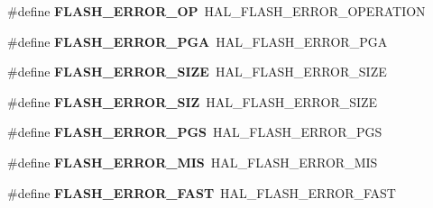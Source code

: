 \begin{DoxyCompactItemize}
\#define {\bfseries F\+L\+A\+S\+H\+\_\+\+E\+R\+R\+O\+R\+\_\+\+OP}~H\+A\+L\+\_\+\+F\+L\+A\+S\+H\+\_\+\+E\+R\+R\+O\+R\+\_\+\+O\+P\+E\+R\+A\+T\+I\+ON
\item 
\mbox{\label{group___h_a_l___f_l_a_s_h___aliased___defines_ga3e610cf7bc499ea0e7eee1380a04f42d}} 
\#define {\bfseries F\+L\+A\+S\+H\+\_\+\+E\+R\+R\+O\+R\+\_\+\+P\+GA}~H\+A\+L\+\_\+\+F\+L\+A\+S\+H\+\_\+\+E\+R\+R\+O\+R\+\_\+\+P\+GA
\item 
\mbox{\label{group___h_a_l___f_l_a_s_h___aliased___defines_gac056ad0617d3beaf8cf2ffb0c87b7266}} 
\#define {\bfseries F\+L\+A\+S\+H\+\_\+\+E\+R\+R\+O\+R\+\_\+\+S\+I\+ZE}~H\+A\+L\+\_\+\+F\+L\+A\+S\+H\+\_\+\+E\+R\+R\+O\+R\+\_\+\+S\+I\+ZE
\item 
\mbox{\label{group___h_a_l___f_l_a_s_h___aliased___defines_gaaa959c347779d59952fcb60d15dbe2b0}} 
\#define {\bfseries F\+L\+A\+S\+H\+\_\+\+E\+R\+R\+O\+R\+\_\+\+S\+IZ}~H\+A\+L\+\_\+\+F\+L\+A\+S\+H\+\_\+\+E\+R\+R\+O\+R\+\_\+\+S\+I\+ZE
\item 
\mbox{\label{group___h_a_l___f_l_a_s_h___aliased___defines_ga578b6dd558f1d11d9791b3c63a61e14b}} 
\#define {\bfseries F\+L\+A\+S\+H\+\_\+\+E\+R\+R\+O\+R\+\_\+\+P\+GS}~H\+A\+L\+\_\+\+F\+L\+A\+S\+H\+\_\+\+E\+R\+R\+O\+R\+\_\+\+P\+GS
\item 
\mbox{\label{group___h_a_l___f_l_a_s_h___aliased___defines_ga10229d78c25e0d944031910606462be1}} 
\#define {\bfseries F\+L\+A\+S\+H\+\_\+\+E\+R\+R\+O\+R\+\_\+\+M\+IS}~H\+A\+L\+\_\+\+F\+L\+A\+S\+H\+\_\+\+E\+R\+R\+O\+R\+\_\+\+M\+IS
\item 
\mbox{\label{group___h_a_l___f_l_a_s_h___aliased___defines_gad20c28b002e14116facba21f02b0d1ba}} 
\#define {\bfseries F\+L\+A\+S\+H\+\_\+\+E\+R\+R\+O\+R\+\_\+\+F\+A\+ST}~H\+A\+L\+\_\+\+F\+L\+A\+S\+H\+\_\+\+E\+R\+R\+O\+R\+\_\+\+F\+A\+ST
\item 
\mbox{\label{group___h_a_l___f_l_a_s_h___aliased___defines_ga9386eae0fe9e5b47720ad2378d27e743}} 

\end{DoxyCompactItemize}

